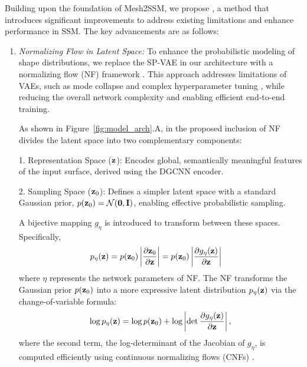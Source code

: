 Building upon the foundation of Mesh2SSM, we propose \model, a method that introduces significant improvements to address existing limitations and enhance performance in SSM. The key advancements are as follows:

\begin{enumerate}

\item \textit{Normalizing Flow in Latent Space:}  
To enhance the probabilistic modeling of shape distributions, we replace the SP-VAE in our architecture with a normalizing flow (NF) framework \cite{rezende2015variational, dinh2016density}. This approach addresses limitations of VAEs, such as mode collapse and complex hyperparameter tuning \cite{alemi2018fixing}, while reducing the overall network complexity and enabling efficient end-to-end training.  

As shown in Figure~\ref{fig:model_arch}.A, in the proposed inclusion of NF divides the latent space into two complementary components:  

1. Representation Space (\(\mathbf{z}\)): Encodes global, semantically meaningful features of the input surface, derived using the DGCNN encoder.  

2. Sampling Space (\(\mathbf{z}_0\)): Defines a simpler latent space with a standard Gaussian prior, \(p(\mathbf{z}_0) = \mathcal{N}(\mathbf{0}, \mathbf{I})\), enabling effective probabilistic sampling.  

A bijective mapping \(g_\eta\) is introduced to transform between these spaces. Specifically,  
\begin{equation}\label{cnf_transformation}
\begin{aligned}
p_{\eta}(\mathbf{z}) &= p(\mathbf{z}_0) \left| \frac{\partial \mathbf{z}_0}{\partial \mathbf{z}} \right| = p(\mathbf{z}_0)\left| \frac{\partial g_{\eta}(\mathbf{z})}{\partial \mathbf{z}} \right| 
\end{aligned}
\end{equation}
where \(\eta\) represents the network parameters of NF. The NF transforms the Gaussian prior \(p(\mathbf{z}_0)\) into a more expressive latent distribution \(p_\eta(\mathbf{z})\) via the change-of-variable formula:  
\begin{equation}\label{cnf_transformation_log}
\begin{aligned}
\operatorname{log}p_\eta(\mathbf{z}) = \operatorname{log}p(\mathbf{z}_0) + \operatorname{log}\left|\det \frac{\partial g_\eta(\mathbf{z})}{\partial \mathbf{z}} \right|,
\end{aligned}
\end{equation}
where the second term, the log-determinant of the Jacobian of \(g_\eta\), is computed efficiently using continuous normalizing flows (CNFs) \cite{chen2023learning}.  
\\

\end{enumerate}

